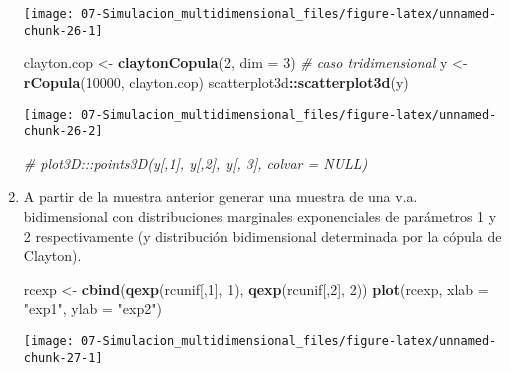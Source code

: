 \documentclass[
]{book}
\newenvironment{Shaded}{\begin{snugshade}}{\end{snugshade}}
\newcommand{\CommentTok}[1]{\textcolor[rgb]{0.56,0.35,0.01}{\textit{#1}}}
\newcommand{\DataTypeTok}[1]{\textcolor[rgb]{0.13,0.29,0.53}{#1}}
\newcommand{\DecValTok}[1]{\textcolor[rgb]{0.00,0.00,0.81}{#1}}
\newcommand{\KeywordTok}[1]{\textcolor[rgb]{0.13,0.29,0.53}{\textbf{#1}}}
\newcommand{\NormalTok}[1]{#1}
\newcommand{\OperatorTok}[1]{\textcolor[rgb]{0.81,0.36,0.00}{\textbf{#1}}}
\newcommand{\StringTok}[1]{\textcolor[rgb]{0.31,0.60,0.02}{#1}}
\theoremstyle{break}
\theoremstyle{definition}
\theoremstyle{definition}
\theoremstyle{definition}
\theoremstyle{remark}
\begin{document}
\begin{enumerate}
  \begin{center}\texttt{[image: 07-Simulacion\_multidimensional\_files/figure-latex/unnamed-chunk-26-1]} \end{center}

\begin{Shaded}
\begin{Highlighting}[]
\NormalTok{clayton.cop <-}\StringTok{ }\KeywordTok{claytonCopula}\NormalTok{(}\DecValTok{2}\NormalTok{, }\DataTypeTok{dim =} \DecValTok{3}\NormalTok{) }\CommentTok{# caso tridimensional}
\NormalTok{y <-}\StringTok{ }\KeywordTok{rCopula}\NormalTok{(}\DecValTok{10000}\NormalTok{, clayton.cop)}
\NormalTok{scatterplot3d}\OperatorTok{::}\KeywordTok{scatterplot3d}\NormalTok{(y)}
\end{Highlighting}
\end{Shaded}

  \begin{center}\texttt{[image: 07-Simulacion\_multidimensional\_files/figure-latex/unnamed-chunk-26-2]} \end{center}

\begin{Shaded}
\begin{Highlighting}[]
\CommentTok{# plot3D:::points3D(y[,1], y[,2], y[, 3], colvar = NULL) }
\end{Highlighting}
\end{Shaded}
\item
  A partir de la muestra anterior generar una muestra de una v.a.
  bidimensional con distribuciones marginales exponenciales de
  parámetros 1 y 2 respectivamente (y distribución bidimensional
  determinada por la cópula de Clayton).

\begin{Shaded}
\begin{Highlighting}[]
\NormalTok{rcexp <-}\StringTok{ }\KeywordTok{cbind}\NormalTok{(}\KeywordTok{qexp}\NormalTok{(rcunif[,}\DecValTok{1}\NormalTok{], }\DecValTok{1}\NormalTok{), }\KeywordTok{qexp}\NormalTok{(rcunif[,}\DecValTok{2}\NormalTok{], }\DecValTok{2}\NormalTok{))}
\KeywordTok{plot}\NormalTok{(rcexp, }\DataTypeTok{xlab =} \StringTok{"exp1"}\NormalTok{, }\DataTypeTok{ylab =} \StringTok{"exp2"}\NormalTok{)}
\end{Highlighting}
\end{Shaded}

  \begin{center}\texttt{[image: 07-Simulacion\_multidimensional\_files/figure-latex/unnamed-chunk-27-1]} \end{center}


\end{enumerate}
\end{document}
